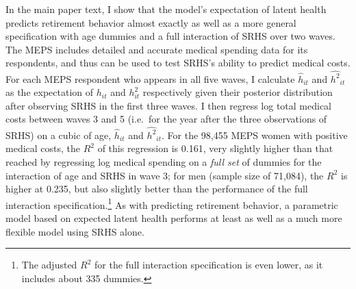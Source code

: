 \documentclass[12pt,pdftex,letterpaper]{article}
\newcommand{\Health}{h}
\newcommand{\RootDir}{..}
\newcommand{\TablesDir}{\RootDir/Tables}
\begin{document}
In the main paper text, I show that the model's expectation of latent health predicts retirement behavior almost exactly as well as a more general specification with age dummies and a full interaction of SRHS over two waves.  The MEPS includes detailed and accurate medical spending data for its respondents, and thus can be used to test SRHS's ability to predict medical costs. For each MEPS respondent who appears in all five waves, I calculate $\widehat{\Health}_{it}$ and $\widehat{\Health^2}_{it}$ as the expectation of $\Health_{it}$ and $\Health^2_{it}$ respectively given their posterior distribution after observing SRHS in the first three waves.  I then regress log total medical costs between waves 3 and 5 (i.e.\ for the year after the three observations of SRHS) on a cubic of age, $\widehat{\Health}_{it}$ and $\widehat{\Health^2}_{it}$.  For the 98,455 MEPS women with positive medical costs, the $R^2$ of this regression is 0.161, very slightly higher than that reached by regressing log medical spending on a \textit{full set} of dummies for the interaction of age and SRHS in wave 3; for men (sample size of 71,084), the $R^2$ is higher at 0.235, but also slightly better than the performance of the full interaction specification.\footnote{The adjusted $R^2$ for the full interaction specification is even lower, as it includes about 335 dummies.} As with predicting retirement behavior, a parametric model based on expected latent health performs at least as well as a much more flexible model using SRHS alone.


\end{document}

